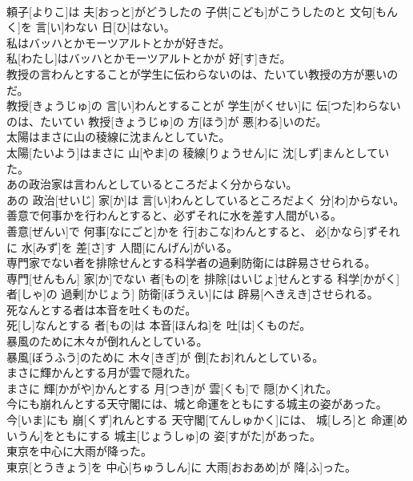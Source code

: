 \documentclass[8pt]{extreport}
\begin{document}
\begin{CJK}{UTF8}{min}
\\	頼子[よりこ]は 夫[おっと]がどうしたの 子供[こども]がこうしたのと 文句[もんく]を 言[い]わない 日[ひ]はない。
\\	私はバッハとかモーツアルトとかが好きだ。	
\\	私[わたし]はバッハとかモーツアルトとかが 好[す]きだ。
\\	教授の言わんとすることが学生に伝わらないのは、たいてい教授の方が悪いのだ。	
\\	教授[きょうじゅ]の 言[い]わんとすることが 学生[がくせい]に 伝[つた]わらないのは、たいてい 教授[きょうじゅ]の 方[ほう]が 悪[わる]いのだ。
\\	太陽はまさに山の稜線に沈まんとしていた。	
\\	太陽[たいよう]はまさに 山[やま]の 稜線[りょうせん]に 沈[しず]まんとしていた。
\\	あの政治家は言わんとしているところだよく分からない。	
\\	あの 政治[せいじ] 家[か]は 言[い]わんとしているところだよく 分[わ]からない。
\\	善意で何事かを行わんとすると、必ずそれに水を差す人間がいる。	
\\	善意[ぜんい]で 何事[なにごと]かを 行[おこな]わんとすると、 必[かなら]ずそれに 水[みず]を 差[さ]す 人間[にんげん]がいる。
\\	専門家でない者を排除せんとする科学者の過剰防衛には辟易させられる。	
\\	専門[せんもん] 家[か]でない 者[もの]を 排除[はいじょ]せんとする 科学[かがく] 者[しゃ]の 過剰[かじょう] 防衛[ぼうえい]には 辟易[へきえき]させられる。
\\	死なんとする者は本音を吐くものだ。	
\\	死[し]なんとする 者[もの]は 本音[ほんね]を 吐[は]くものだ。
\\	暴風のために木々が倒れんとしている。	
\\	暴風[ぼうふう]のために 木々[きぎ]が 倒[たお]れんとしている。
\\	まさに輝かんとする月が雲で隠れた。	
\\	まさに 輝[かがや]かんとする 月[つき]が 雲[くも]で 隠[かく]れた。
\\	今にも崩れんとする天守閣には、城と命運をともにする城主の姿があった。	
\\	今[いま]にも 崩[くず]れんとする 天守閣[てんしゅかく]には、 城[しろ]と 命運[めいうん]をともにする 城主[じょうしゅ]の 姿[すがた]があった。
\\	東京を中心に大雨が降った。	
\\	東京[とうきょう]を 中心[ちゅうしん]に 大雨[おおあめ]が 降[ふ]った。

\end{CJK}
\end{document}
